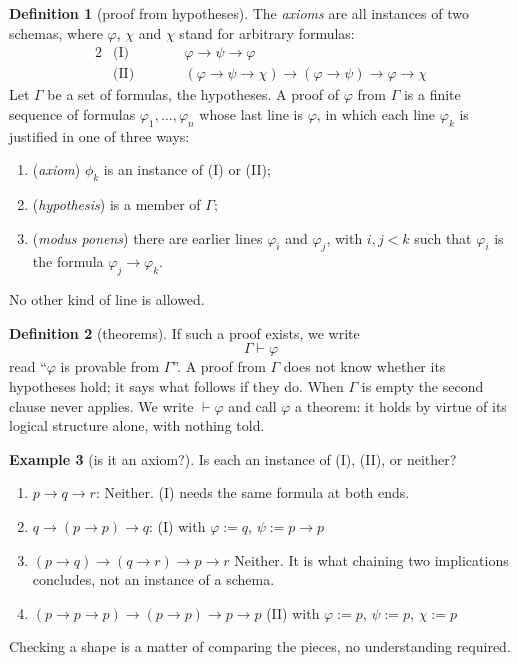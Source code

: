 \documentclass[a4paper, 11pt]{article}
\theoremstyle{definition}
\newtheorem{definition}{Definition}[section]
\newtheorem{example}[definition]{Example}
\begin{document}
\begin{definition}[proof from hypotheses]
    The \textit{axioms} are all instances of two schemas, where $\varphi$, $\chi$ and $\chi$ stand for arbitrary formulas: 
    \begin{alignat*}{2}
        &\text{(I)}\qquad  && \varphi \to \psi \to \varphi \\
        &\text{(II)}\qquad && (\varphi \to \psi \to \chi) \to (\varphi \to \psi) \to \varphi \to \chi
    \end{alignat*}
    Let $\Gamma$ be a set of formulas, the hypotheses. A proof of $\varphi$ from $\Gamma$ is a finite sequence of formulas $\varphi_1, \dots, \varphi_n$ whose last line is $\varphi$, in which each line $\varphi_k$ is justified in one of three ways:
    \begin{enumerate}
        \item (\textit{axiom}) $\phi_k$ is an instance of (I) or (II);
        \item (\textit{hypothesis}) is a member of $\Gamma$;
        \item (\textit{modus ponens}) there are earlier lines $\varphi_i$ and $\varphi_j$, with $i, j < k$ such that $\varphi_i$ is the formula $\varphi_j \to \varphi_k$.
    \end{enumerate}
    No other kind of line is allowed.
\end{definition}

\newpage

\begin{definition}[theorems]
    If such a proof exists, we write \[\Gamma \vdash \varphi\] read ``$\varphi$ is provable from $\Gamma$''. A proof from $\Gamma$ does not know whether its hypotheses hold; it says what follows if they do.
    When $\Gamma$ is empty the second clause never applies. We write $\vdash \varphi$ and call $\varphi$ a theorem: it holds by virtue of its logical structure alone, with nothing told.
\end{definition}

\begin{example}[is it an axiom?]
Is each an instance of (I), (II), or neither?
\begin{enumerate}
    \item $p \to q \to r$: Neither. (I) needs the same formula at both ends.
    \item $q \to (p \to p) \to q$: (I) with $\varphi := q$, $\psi := p \to p$
    \item $(p \to q) \to (q \to r) \to p \to r$ Neither. It is what chaining two implications concludes, not an instance of a schema.
    \item $(p \to p \to p) \to (p \to p) \to p \to p$ (II) with $\varphi := p$, $\psi := p$, $\chi := p$
\end{enumerate}
Checking a shape is a matter of comparing the pieces, no understanding required.
\end{example}
\end{document}
